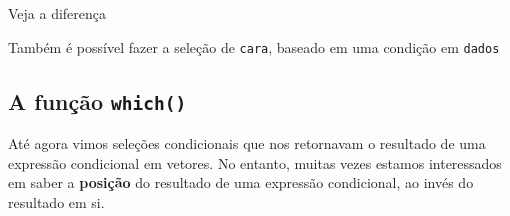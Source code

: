 \documentclass[10pt,a4paper]{book}
\newenvironment{Shaded}{\begin{snugshade}}{\end{snugshade}}
\newcommand{\KeywordTok}[1]{\textcolor[rgb]{0.13,0.29,0.53}{\textbf{#1}}}
\newcommand{\DecValTok}[1]{\textcolor[rgb]{0.00,0.00,0.81}{#1}}
\newcommand{\StringTok}[1]{\textcolor[rgb]{0.31,0.60,0.02}{#1}}
\newcommand{\OtherTok}[1]{\textcolor[rgb]{0.56,0.35,0.01}{#1}}
\newcommand{\OperatorTok}[1]{\textcolor[rgb]{0.81,0.36,0.00}{\textbf{#1}}}
\newcommand{\NormalTok}[1]{#1}
\begin{document}
Veja a diferença

\begin{Shaded}
\end{Shaded}

Também é possível fazer a seleção de \texttt{cara}, baseado em uma
condição em \texttt{dados}

\begin{Shaded}
\end{Shaded}

\subsection{\texorpdfstring{A função
\texttt{which()}}{A função which()}}\label{a-funcao-which}

Até agora vimos seleções condicionais que nos retornavam o resultado de
uma expressão condicional em vetores. No entanto, muitas vezes estamos
interessados em saber a \textbf{posição} do resultado de uma expressão
condicional, ao invés do resultado em si.
\end{document}
